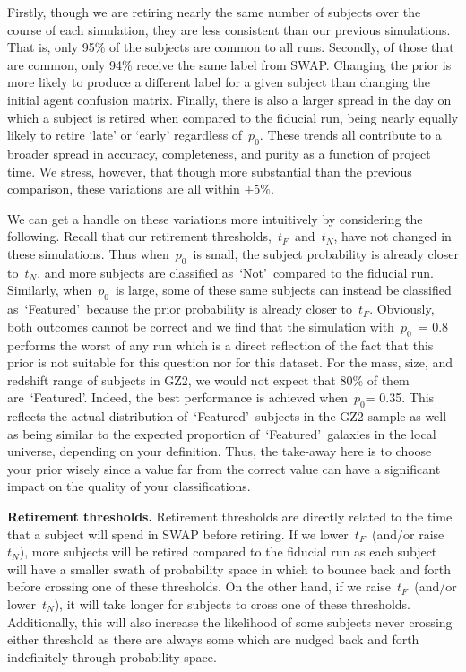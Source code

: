 \documentclass[twocolumn]{aastex6}
\newcommand{\p}{$p_0$}
\newcommand{\tf}{$t_F$}
\newcommand{\tn}{$t_N$}
\newcommand{\feat}{`Featured'}
\newcommand{\notfeat}{`Not'}
\begin{document}
Firstly, though we are retiring nearly the same number of subjects over the course
of each simulation, they are less consistent than our previous simulations. That is, 
only 95\% of the subjects are common to all runs. Secondly, of those that are 
common, only 94\% receive the same label from SWAP. Changing the prior is more
likely to produce a different label for a given subject than changing the initial 
agent confusion matrix. Finally, there is also a larger spread in the day on which 
a subject is retired when compared to the fiducial run, being nearly equally likely to 
retire `late' or `early' regardless of~\p. These trends all contribute to a broader 
spread in accuracy, completeness, and purity as a function of project time.
We stress, however, that though more substantial than the previous comparison, 
these variations are all within $\pm5\%$. 

We can get a handle on these variations more intuitively by considering the following.
Recall that our retirement thresholds,~\tf~and~\tn, have not changed in these simulations. 
Thus when~\p~is small, the subject probability is already closer to~\tn, and more 
subjects are classified as~\notfeat~compared to the fiducial run.
Similarly, when~\p~is large, some of these same subjects can instead be classified
as~\feat~because the prior probability is already closer to~\tf. Obviously, both 
outcomes cannot be correct and we find that the simulation with~\p~= 0.8 performs
the worst of any run which is a direct reflection of the fact that this prior is not 
suitable for this question nor for this dataset. For the mass, size, and redshift range
of subjects in GZ2, we would not expect that 80\% of them are~\feat. Indeed, 
the best performance is achieved when~\p = 0.35.  This reflects the actual 
distribution of~\feat~subjects in the GZ2 sample as well as being similar to the 
expected proportion of~\feat~galaxies in the local universe, depending on your
definition.
Thus, the take-away here is to choose your prior wisely since a value far from the correct
value can have a significant impact on the quality of your classifications.
 


\textbf{Retirement thresholds.}
Retirement thresholds are directly related to the time that a subject will spend
in SWAP before retiring.  If we lower~\tf~(and/or raise~\tn), more subjects will be retired
compared to the fiducial run as each subject will have a smaller swath of probability space
in which to bounce back and forth before crossing one of these thresholds.
On the other hand, if we raise~\tf~(and/or lower~\tn), it will take longer for subjects
to cross one of these thresholds. Additionally, this will also increase the likelihood of
some subjects never crossing either threshold as there are always some 
which are nudged back and forth indefinitely through probability space.
\end{document}
